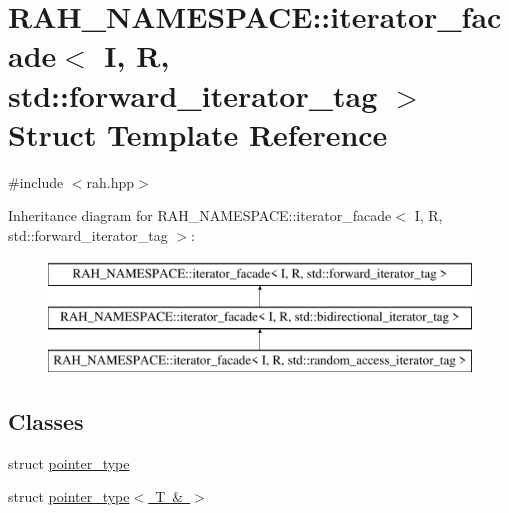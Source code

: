 \hypertarget{struct_r_a_h___n_a_m_e_s_p_a_c_e_1_1iterator__facade_3_01_i_00_01_r_00_01std_1_1forward__iterator__tag_01_4}{}\section{R\+A\+H\+\_\+\+N\+A\+M\+E\+S\+P\+A\+CE\+::iterator\+\_\+facade$<$ I, R, std\+::forward\+\_\+iterator\+\_\+tag $>$ Struct Template Reference}
\label{struct_r_a_h___n_a_m_e_s_p_a_c_e_1_1iterator__facade_3_01_i_00_01_r_00_01std_1_1forward__iterator__tag_01_4}


{\ttfamily \#include $<$rah.\+hpp$>$}

Inheritance diagram for R\+A\+H\+\_\+\+N\+A\+M\+E\+S\+P\+A\+CE\+::iterator\+\_\+facade$<$ I, R, std\+::forward\+\_\+iterator\+\_\+tag $>$\+:\begin{figure}[H]
\begin{center}
\leavevmode
\includegraphics[height=3.000000cm]{struct_r_a_h___n_a_m_e_s_p_a_c_e_1_1iterator__facade_3_01_i_00_01_r_00_01std_1_1forward__iterator__tag_01_4}
\end{center}
\end{figure}
\subsection*{Classes}
\begin{DoxyCompactItemize}
\item 
struct \mbox{\hyperlink{struct_r_a_h___n_a_m_e_s_p_a_c_e_1_1iterator__facade_3_01_i_00_01_r_00_01std_1_1forward__iterator__tag_01_4_1_1pointer__type}{pointer\+\_\+type}}
\item 
struct \mbox{\hyperlink{struct_r_a_h___n_a_m_e_s_p_a_c_e_1_1iterator__facade_3_01_i_00_01_r_00_01std_1_1forward__iteratoea928274de843ca75854fe11c7a3d72e}{pointer\+\_\+type$<$ T \& $>$}}
\end{DoxyCompactItemize}
